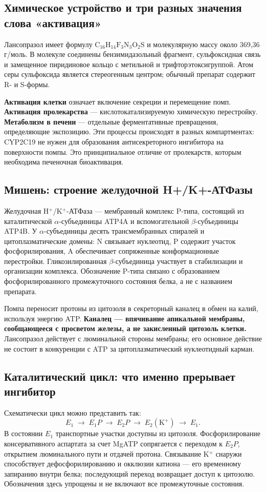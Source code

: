 \documentclass[11pt,a4paper,notitlepage]{report}
\newcommand{\src}[1]{\unskip\space\cite{#1}}
\begin{document}
\subsection{Химическое устройство и три разных значения слова «активация»}
Лансопразол имеет формулу $\mathrm{C}_{16}\mathrm{H}_{14}\mathrm{F}_{3}\mathrm{N}_{3}\mathrm{O}_{2}\mathrm{S}$ и молекулярную массу около 369,36 г/моль. В молекуле соединены бензимидазольный фрагмент, сульфоксидная связь и замещенное пиридиновое кольцо с метильной и трифторэтоксигруппой. Атом серы сульфоксида является стереогенным центром; обычный препарат содержит R- и S-формы.\src{uslabel}

\textbf{Активация клетки} означает включение секреции и перемещение помп. \textbf{Активация пролекарства} --- кислотокатализируемую химическую перестройку. \textbf{Метаболизм в печени} --- отдельные ферментативные превращения, определяющие экспозицию. Эти процессы происходят в разных компартментах: CYP2C19 не нужен для образования антисекреторного ингибитора на поверхности помпы. Это принципиальное отличие от пролекарств, которым необходима печеночная биоактивация.\src{molnagaya90,molp450}

\subsection{Мишень: строение желудочной H+/K+-АТФазы}
Желудочная H$^+$/K$^+$-АТФаза --- мембранный комплекс P-типа, состоящий из каталитической $\alpha$-субъединицы ATP4A и вспомогательной $\beta$-субъединицы ATP4B. У $\alpha$-субъединицы десять трансмембранных спиралей и цитоплазматические домены: N связывает нуклеотид, P содержит участок фосфорилирования, A обеспечивает сопряженные конформационные перестройки. Гликозилированная $\beta$-субъединица участвует в стабилизации и организации комплекса. Обозначение P-типа связано с образованием фосфорилированного промежуточного состояния белка, а не с названием препарата.\src{molstructure}

Помпа переносит протоны из цитозоля в секреторный каналец в обмен на калий, используя энергию ATP. \textbf{Каналец --- впячивание апикальной мембраны, сообщающееся с просветом железы, а не закисленный цитозоль клетки.} Лансопразол действует с люминальной стороны мембраны; его основное действие не состоит в конкуренции с ATP за цитоплазматический нуклеотидный карман.\src{molstructure,molcys}

\subsection{Каталитический цикл: что именно прерывает ингибитор}
Схематически цикл можно представить так:
\[
E_1 \;\longrightarrow\; E_1P
\;\longrightarrow\; E_2P
\;\longrightarrow\; E_2(\mathrm{K}^+)
\;\longrightarrow\; E_1.
\]
В состоянии $E_1$ транспортные участки доступны из цитозоля. Фосфорилирование консервативного аспартата за счет MgATP сопрягается с переходом к $E_2P$, открытием люминального пути и отдачей протона. Связывание K$^+$ снаружи способствует дефосфорилированию и окклюзии катиона --- его временному запиранию внутри белка; последующий переход возвращает доступ к цитозолю. Обозначения здесь упрощены и не включают все промежуточные состояния.\src{molk}
\end{document}
